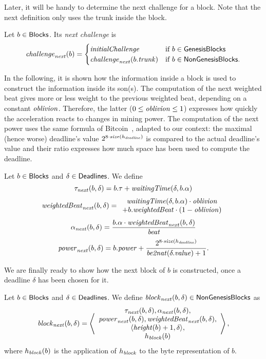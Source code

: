 Later, it will be handy to determine the next challenge for a block. Note that
the next definition only uses the trunk inside the block.
%
\begin{definition}\label{def:next_challenge_from_block}
  Let $b\in{\mathsf{Blocks}}$. Its \emph{next challenge} is
  \[
  {\mathit{challenge}}_{\mathit{next}}(b)=\begin{cases}
  {\mathit{initialChallenge}} & \text{if $b\in{\mathsf{GenesisBlocks}}$}\\
  {\mathit{challenge}}_{\mathit{next}}(b.{\mathit{trunk}}) & \text{if $b\in{\mathsf{NonGenesisBlocks}}$.}
  \end{cases}
  \]
\end{definition}

In the following, it is shown how the information inside a block is used to construct
the information inside its son(s). The computation of the next weighted beat
gives more or less weight to the previous weighted beat, depending on a constant ${\mathit{oblivion}}$.
Therefore, the latter ($0\le{\mathit{oblivion}}\le 1$) expresses how quickly the acceleration reacts to changes
in mining power. The computation of the next power uses the same formula of Bitcoin~\cite{WalkerG24},
adapted to our context: the maximal (hence worse) deadline's value $2^{8\cdot{\mathit{size}}(h_{\mathit{deadline}})}$ is compared
to the actual deadline's value and their ratio expresses how much space has been used to compute the deadline.
%
\begin{definition}\label{def:next}
  Let $b\in{\mathsf{Blocks}}$ and $\delta\in{\mathsf{Deadlines}}$. We define
  \[
  \tau_{\mathit{next}}(b,\delta)=b.\tau+{\mathit{waitingTime}}(\delta,b.\alpha)
  \]
  \[
  \mathit{weightedBeat}_{\mathit{next}}(b,\delta)=\begin{array}{c}
  {\mathit{waitingTime}}(\delta,b.\alpha)\cdot{\mathit{oblivion}}\\
  +b.\mathit{weightedBeat}\cdot(1-{\mathit{oblivion}})
  \end{array}
  \]
  \[
  \alpha_{\mathit{next}}(b,\delta)=\frac{b.\alpha\cdot\mathit{weightedBeat}_{\mathit{next}}(b,\delta)}{{\mathit{beat}}}
  \]
  \[
  {\mathit{power}}_{\mathit{next}}(b,\delta)=b.{\mathit{power}}+\frac{2^{8\cdot{\mathit{size}}(h_{\mathit{deadline}})}}{{\mathit{be2nat}}(\delta.\mathit{value})+1}.
  \]
\end{definition}

We are finally ready to show how the next block of $b$ is constructed, once
a deadline $\delta$ has been chosen for it.
%
\begin{definition}\label{def:next_block}
  Let $b\in{\mathsf{Blocks}}$ and $\delta\in{\mathsf{Deadlines}}$. We define
  ${\mathit{block}}_{\mathit{next}}(b,\delta)\in{\mathsf{NonGenesisBlocks}}$ as
  \[
  {\mathit{block}}_{\mathit{next}}(b,\delta)=\left\langle\begin{array}{c}
  \tau_{\mathit{next}}(b,\delta),\alpha_{\mathit{next}}(b,\delta),\\
  {\mathit{power}}_{\mathit{next}}(b,\delta),\mathit{weightedBeat}_{\mathit{next}}(b,\delta),\\
  \langle{\mathit{height}}(b)+1,\delta\rangle,\\
  h_{\mathit{block}}(b)
  \end{array}\right\rangle,
  \]
  where $h_{\mathit{block}}(b)$ is the application of $h_{\mathit{block}}$ to the byte representation of $b$.
\end{definition}


